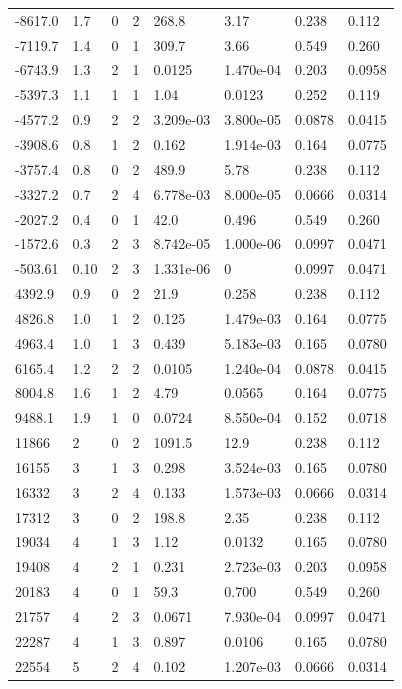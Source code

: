 \documentclass[preview]{standalone}
\begin{document}
{{\begin{tabular}{L{1.2cm}C{1.2cm} C{0.3cm}C{0.5cm} C{1.4cm}C{1.4cm} C{1.4cm}C{1.4cm}}
  -8617.0  &   1.7  & 0     &  2 &  268.8  & 3.17  & 0.238 &  0.112   \\ 
  -7119.7  &   1.4  & 0     &  1 &  309.7  & 3.66  & 0.549 &  0.260   \\ 
  -6743.9  &   1.3  & 2     &  1 &  0.0125  & 1.470e-04  & 0.203 &  0.0958   \\ 
  -5397.3  &   1.1  & 1     &  1 &  1.04  & 0.0123  & 0.252 &  0.119   \\ 
  -4577.2  &   0.9  & 2     &  2 &  3.209e-03  & 3.800e-05  & 0.0878 &  0.0415   \\ 
  -3908.6  &   0.8  & 1     &  2 &  0.162  & 1.914e-03  & 0.164 &  0.0775   \\ 
  -3757.4  &   0.8  & 0     &  2 &  489.9  & 5.78  & 0.238 &  0.112   \\ 
  -3327.2  &   0.7  & 2     &  4 &  6.778e-03  & 8.000e-05  & 0.0666 &  0.0314   \\ 
  -2027.2  &   0.4  & 0     &  1 &  42.0  & 0.496  & 0.549 &  0.260   \\ 
  -1572.6  &   0.3  & 2     &  3 &  8.742e-05  & 1.000e-06  & 0.0997 &  0.0471   \\ 
  -503.61  &  0.10  & 2     &  3 &  1.331e-06  & 0  & 0.0997 &  0.0471   \\ 
  4392.9  &   0.9  & 0     &  2 &  21.9  & 0.258  & 0.238 &  0.112   \\ 
  4826.8  &   1.0  & 1     &  2 &  0.125  & 1.479e-03  & 0.164 &  0.0775   \\ 
  4963.4  &   1.0  & 1     &  3 &  0.439  & 5.183e-03  & 0.165 &  0.0780   \\ 
  6165.4  &   1.2  & 2     &  2 &  0.0105  & 1.240e-04  & 0.0878 &  0.0415   \\ 
  8004.8  &   1.6  & 1     &  2 &  4.79  & 0.0565  & 0.164 &  0.0775   \\ 
  9488.1  &   1.9  & 1     &  0 &  0.0724  & 8.550e-04  & 0.152 &  0.0718   \\ 
  11866  &     2  & 0     &  2 &  1091.5  & 12.9  & 0.238 &  0.112   \\ 
  16155  &     3  & 1     &  3 &  0.298  & 3.524e-03  & 0.165 &  0.0780   \\ 
  16332  &     3  & 2     &  4 &  0.133  & 1.573e-03  & 0.0666 &  0.0314   \\ 
  17312  &     3  & 0     &  2 &  198.8  & 2.35  & 0.238 &  0.112   \\ 
  19034  &     4  & 1     &  3 &  1.12  & 0.0132  & 0.165 &  0.0780   \\ 
  19408  &     4  & 2     &  1 &  0.231  & 2.723e-03  & 0.203 &  0.0958   \\ 
  20183  &     4  & 0     &  1 &  59.3  & 0.700  & 0.549 &  0.260   \\ 
  21757  &     4  & 2     &  3 &  0.0671  & 7.930e-04  & 0.0997 &  0.0471   \\ 
  22287  &     4  & 1     &  3 &  0.897  & 0.0106  & 0.165 &  0.0780   \\ 
  22554  &     5  & 2     &  4 &  0.102  & 1.207e-03  & 0.0666 &  0.0314   \\ 
\hline 
\end{tabular} 

}}
\end{document}
